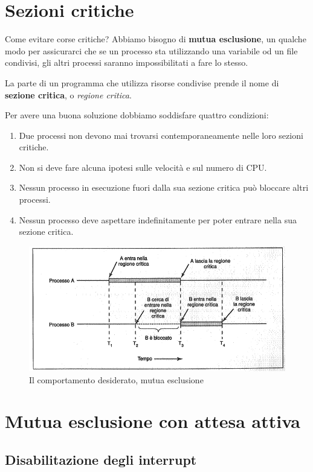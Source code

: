 \section{Sezioni critiche}
Come evitare corse critiche? Abbiamo bisogno di \textbf{mutua esclusione}, un qualche modo per assicurarci che se un processo sta utilizzando una variabile od un file condivisi, gli altri processi saranno impossibilitati a fare lo stesso.

La parte di un programma che utilizza risorse condivise prende il nome di \textbf{sezione critica}, o \textit{regione critica}. 

Per avere una buona soluzione dobbiamo soddisfare quattro condizioni:
\begin{enumerate}
    \item Due processi non devono mai trovarsi contemporaneamente nelle loro sezioni critiche.
    \item Non si deve fare alcuna ipotesi sulle velocità e sul numero di CPU.
    \item Nessun processo in esecuzione fuori dalla sua sezione critica può bloccare altri processi.
    \item Nessun processo deve aspettare indefinitamente per poter entrare nella sua sezione critica.
\end{enumerate}

\begin{figure}[H]
    \centering
    \includegraphics[width=1\linewidth]{assets/mutuaesclusione6.png}
    \caption{Il comportamento desiderato, mutua esclusione}
\end{figure}

\section{Mutua esclusione con attesa attiva}

\subsection{Disabilitazione degli interrupt}

